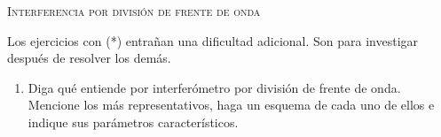 \documentclass[11pt, spanish, a4paper, twoside]{article}
\begin{document}
\begin{center}
	\textsc{\LARGE Interferencia por división de frente de onda}
\end{center}

Los ejercicios con (*) entrañan una dificultad adicional. Son para investigar después de resolver los demás.


\begin{enumerate}


% 
% 
% 


\section*{Resumen: interferómetros por división de frente de onda}
\item Diga qué entiende por interferómetro por división de frente de onda.
Mencione los más representativos, haga un esquema de cada uno de ellos e indique sus parámetros característicos.


\end{enumerate}
\end{document}
